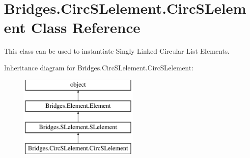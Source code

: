 \hypertarget{class_bridges_1_1_circ_s_lelement_1_1_circ_s_lelement}{}\section{Bridges.\+Circ\+S\+Lelement.\+Circ\+S\+Lelement Class Reference}
\label{class_bridges_1_1_circ_s_lelement_1_1_circ_s_lelement}


This class can be used to instantiate Singly Linked Circular List Elements.  


Inheritance diagram for Bridges.\+Circ\+S\+Lelement.\+Circ\+S\+Lelement\+:\begin{figure}[H]
\begin{center}
\leavevmode
\includegraphics[height=4.000000cm]{class_bridges_1_1_circ_s_lelement_1_1_circ_s_lelement}
\end{center}
\end{figure}

